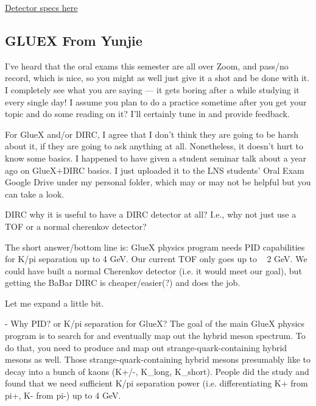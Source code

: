             
            
            
            
            
            
\href{https://www.jlab.org/Hall-B/clas12-web/}{Detector specs here}     


            
          
          
\iffalse          
\subsection{GLUEX From Yunjie}
    I’ve heard that the oral exams this semester are all over Zoom, and pass/no record, which is nice, so you might as well just give it a shot and be done with it. I completely see what you are saying — it gets boring after a while studying it every single day! I assume you plan to do a practice sometime after you get your topic and do some reading on it? I’ll certainly tune in and provide feedback.
    
    For GlueX and/or DIRC, I agree that I don’t think they are going to be harsh about it, if they are going to ask anything at all. Nonetheless, it doesn’t hurt to know some basics. I happened to have given a student seminar talk about a year ago on GlueX+DIRC basics. I just uploaded it to the LNS students’ Oral Exam Google Drive under my personal folder, which may or may not be helpful but you can take a look.
    
    DIRC
    why it is useful to have a DIRC detector at all? I.e., why not just use a TOF or a normal cherenkov detector? 
    
    The short answer/bottom line is: GlueX physics program needs PID capabilities for K/pi separation up to 4 GeV. Our current TOF only goes up to ~ 2 GeV. We could have built a normal Cherenkov detector (i.e. it would meet our goal), but getting the BaBar DIRC is cheaper/easier(?) and does the job.
    
    Let me expand a little bit. 
    
     - Why PID? or K/pi separation for GlueX?
    The goal of the main GlueX physics program is to search for and eventually map out the hybrid meson spectrum. To do that, you need to produce and map out strange-quark-containing hybrid mesons as well. Those strange-quark-containing hybrid mesons presumably like to decay into a bunch of kaons (K+/-, K_long, K_short). People did the study and found that we need sufficient K/pi separation power (i.e. differentiating K+ from pi+, K- from pi-) up to 4 GeV.
    
